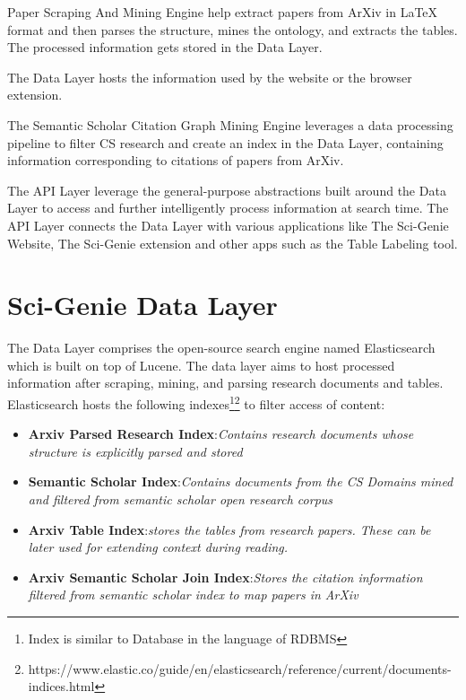 Paper Scraping And Mining Engine help extract papers from ArXiv in LaTeX format and then parses the structure, mines the ontology, and extracts the tables. The processed information gets stored in the Data Layer. 

The Data Layer hosts the information used by the website or the browser extension. 

The Semantic Scholar Citation Graph Mining Engine leverages a data processing pipeline to filter CS research and create an index in the Data Layer, containing information corresponding to citations of papers from ArXiv. 

The API Layer leverage the general-purpose abstractions built around the Data Layer to access and further intelligently process information at search time. The API Layer connects the Data Layer with various applications like The Sci-Genie Website, The Sci-Genie extension and other apps such as the Table Labeling tool. 

\section{Sci-Genie Data Layer}
\label{sci-genie-core:data-layer}
The Data Layer comprises the open-source search engine named Elasticsearch\parencite{gormley2015elasticsearch} which is built on top of Lucene. 
The data layer aims to host processed information after scraping, mining, and parsing research documents and tables. 
Elasticsearch hosts the following indexes\footnote{Index is similar to Database in the language of RDBMS}\footnote{https://www.elastic.co/guide/en/elasticsearch/reference/current/documents-indices.html} to filter access of content:
\begin{itemize}
    \item \textbf{Arxiv Parsed Research Index}:\textit{Contains research documents whose structure is explicitly parsed and stored}
    \item \textbf{Semantic Scholar Index}:\textit{Contains documents from the CS Domains mined and filtered from semantic scholar open research corpus}
    \item \textbf{Arxiv Table Index}:\textit{stores the tables from research papers. These can be later used for extending context during reading.}
    \item \textbf{Arxiv Semantic Scholar Join Index}:\textit{Stores the citation information filtered from semantic scholar index to map papers in ArXiv} 
\end{itemize} 

